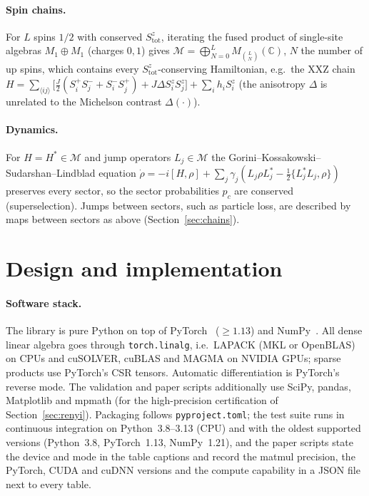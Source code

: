 \documentclass[11pt]{article}
\newcommand{\C}{\mathbb{C}}
\newcommand{\M}{\mathcal{M}}
\begin{document}
\paragraph{Spin chains.} For $L$ spins $1/2$ with conserved $S^z_{\mathrm{tot}}$, iterating the fused
product of single-site algebras $M_1\oplus M_1$ (charges $0,1$) gives
$\M=\bigoplus_{N=0}^LM_{\binom LN}(\C)$, $N$ the number of up spins, which contains every
$S^z_{\mathrm{tot}}$-conserving Hamiltonian, e.g.\ the XXZ chain
$H=\sum_{\langle ij\rangle}\bigl[\tfrac J2(S^+_iS^-_j+S^-_iS^+_j)+J\Delta S^z_iS^z_j\bigr]+\sum_ih_iS^z_i$ (the
anisotropy $\Delta$ is unrelated to the Michelson contrast $\Delta(\cdot)$).

\paragraph{Dynamics.} For $H=H^*\in\M$ and jump operators $L_j\in\M$ the
Gorini--Kossakowski--Sudarshan--Lindblad equation
$\dot\rho=-i[H,\rho]+\sum_j\gamma_j(L_j\rho L_j^*-\tfrac12\{L_j^*L_j,\rho\})$ preserves every sector,
so the sector probabilities $p_c$ are conserved (superselection). Jumps between sectors, such as particle loss,
are described by maps between sectors as above (Section~\ref{sec:chains}).

\section{Design and implementation}\label{sec:design}

\paragraph{Software stack.} The library is pure Python on top of PyTorch~\cite{paszke2019} ($\ge1.13$) and NumPy~\cite{harris2020}. All dense linear algebra goes through \texttt{torch.linalg}, i.e.\ LAPACK
(MKL or OpenBLAS) on CPUs and cuSOLVER, cuBLAS and MAGMA on NVIDIA GPUs; sparse products use PyTorch's CSR
tensors. Automatic differentiation is PyTorch's reverse mode. The validation and paper scripts additionally use
SciPy, pandas, Matplotlib and mpmath (for the high-precision certification of Section~\ref{sec:renyi}). Packaging follows \texttt{pyproject.toml}; the test suite runs in continuous
integration on Python~3.8--3.13 (CPU) and with the oldest supported versions (Python~3.8, PyTorch~1.13, NumPy~1.21), and the paper scripts state the device and mode in the table captions and record the matmul precision, the
PyTorch, CUDA and cuDNN versions and the compute capability in a JSON file next to every table.
\end{document}
